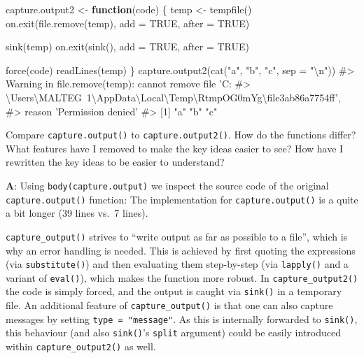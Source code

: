 \documentclass[
]{krantz}
\makeatletter
\newenvironment{Shaded}{\begin{snugshade}}{\end{snugshade}}
\newcommand{\CharTok}[1]{\textcolor[rgb]{0.31,0.60,0.02}{#1}}
\newcommand{\CommentTok}[1]{\textcolor[rgb]{0.56,0.35,0.01}{\textit{#1}}}
\newcommand{\ControlFlowTok}[1]{\textcolor[rgb]{0.13,0.29,0.53}{\textbf{#1}}}
\newcommand{\DataTypeTok}[1]{\textcolor[rgb]{0.13,0.29,0.53}{#1}}
\newcommand{\KeywordTok}[1]{\textcolor[rgb]{0.13,0.29,0.53}{\textbf{#1}}}
\newcommand{\NormalTok}[1]{#1}
\newcommand{\OtherTok}[1]{\textcolor[rgb]{0.56,0.35,0.01}{#1}}
\newcommand{\StringTok}[1]{\textcolor[rgb]{0.31,0.60,0.02}{#1}}
\newenvironment{kframe}{%
\medskip{}
\setlength{\fboxsep}{.8em}
 \def\at@end@of@kframe{}%
 \ifinner\ifhmode%
  \def\at@end@of@kframe{\end{minipage}}%
  \begin{minipage}{\columnwidth}%
 \fi\fi%
 \def\FrameCommand##1{\hskip\@totalleftmargin \hskip-\fboxsep
 \colorbox{shadecolor}{##1}\hskip-\fboxsep
     \hskip-\linewidth \hskip-\@totalleftmargin \hskip\columnwidth}%
 \MakeFramed {\advance\hsize-\width
   \@totalleftmargin\z@ \linewidth\hsize
   \@setminipage}}%
 {\par\unskip\endMakeFramed%
 \at@end@of@kframe}
\renewenvironment{Shaded}{\begin{kframe}}{\end{kframe}}
\renewcommand{\KeywordTok} [1]{\textcolor[rgb]{0.00,0.44,0.13}{{#1}}}
\renewcommand{\DataTypeTok}[1]{\textcolor[rgb]{0.56,0.13,0.00}{{#1}}}
\renewcommand{\CharTok}    [1]{\textcolor[rgb]{0.25,0.44,0.63}{{#1}}}
\renewcommand{\StringTok}  [1]{\textcolor[rgb]{0.25,0.44,0.63}{{#1}}}
\renewcommand{\CommentTok} [1]{\textcolor[rgb]{0.38,0.63,0.69}{{#1}}}
\renewcommand{\OtherTok}   [1]{\textcolor[rgb]{0.00,0.44,0.13}{{#1}}}
\renewcommand{\NormalTok}  [1]{{#1}}
\makeatother
\begin{document}
\begin{Shaded}
\begin{Highlighting}[]
\NormalTok{capture.output2 <-}\StringTok{ }\ControlFlowTok{function}\NormalTok{(code) \{}
\NormalTok{  temp <-}\StringTok{ }\KeywordTok{tempfile}\NormalTok{()}
  \KeywordTok{on.exit}\NormalTok{(}\KeywordTok{file.remove}\NormalTok{(temp), }\DataTypeTok{add =} \OtherTok{TRUE}\NormalTok{, }\DataTypeTok{after =} \OtherTok{TRUE}\NormalTok{)}
  
  \KeywordTok{sink}\NormalTok{(temp)}
  \KeywordTok{on.exit}\NormalTok{(}\KeywordTok{sink}\NormalTok{(), }\DataTypeTok{add =} \OtherTok{TRUE}\NormalTok{, }\DataTypeTok{after =} \OtherTok{TRUE}\NormalTok{)}
  
  \KeywordTok{force}\NormalTok{(code)}
  \KeywordTok{readLines}\NormalTok{(temp)}
\NormalTok{\}}
\KeywordTok{capture.output2}\NormalTok{(}\KeywordTok{cat}\NormalTok{(}\StringTok{"a"}\NormalTok{, }\StringTok{"b"}\NormalTok{, }\StringTok{"c"}\NormalTok{, }\DataTypeTok{sep =} \StringTok{"}\CharTok{\textbackslash{}n}\StringTok{"}\NormalTok{))}
\CommentTok{#> Warning in file.remove(temp): cannot remove file 'C:}
\CommentTok{#> \textbackslash{}Users\textbackslash{}MALTEG~1\textbackslash{}AppData\textbackslash{}Local\textbackslash{}Temp\textbackslash{}RtmpOG0mYg\textbackslash{}file3ab86a7754ff',}
\CommentTok{#> reason 'Permission denied'}
\CommentTok{#> [1] "a" "b" "c"}
\end{Highlighting}
\end{Shaded}

Compare \texttt{capture.output()} to \texttt{capture.output2()}. How do the functions differ? What features have I removed to make the key ideas easier to see? How have I rewritten the key ideas to be easier to understand?

\textbf{{A}}: Using \texttt{body(capture.output)} we inspect the source code of the original \texttt{capture.output()} function: The implementation for \texttt{capture.output()} is a quite a bit longer (39 lines vs.~7 lines).

\texttt{capture\_output()} strives to ``write output as far as possible to a file'', which is why an error handling is needed. This is achieved by first quoting the expressions (via \texttt{substitute()}) and then evaluating them step-by-step (via \texttt{lapply()} and a variant of \texttt{eval()}), which makes the function more robust. In \texttt{capture\_output2()} the code is simply forced, and the output is caught via \texttt{sink()} in a temporary file. An additional feature of \texttt{capture\_output()} is that one can also capture messages by setting \texttt{type\ =\ "message"}. As this is internally forwarded to \texttt{sink()}, this behaviour (and also \texttt{sink()}'s \texttt{split} argument) could be easily introduced within \texttt{capture\_output2()} as well.
\end{document}
